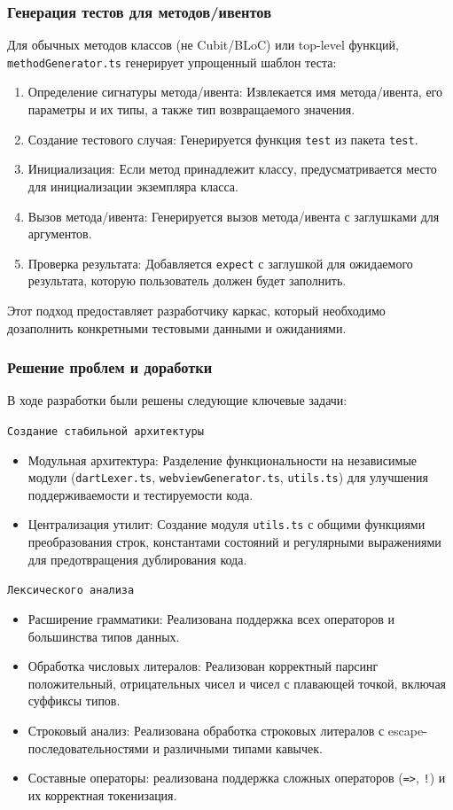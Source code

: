 \documentclass[14pt, russian]{scrartcl}
\begin{document}
\subsubsection{Генерация тестов для методов/ивентов}

Для обычных методов классов (не Cubit/BLoC) или top-level функций, \texttt{methodGenerator.ts} генерирует упрощенный шаблон теста:
\begin{enumerate}
    \item Определение сигнатуры метода/ивента: Извлекается имя метода/ивента, его параметры и их типы, а также тип возвращаемого значения.
    \item Создание тестового случая: Генерируется функция \texttt{test} из пакета \texttt{test}.
    \item Инициализация: Если метод принадлежит классу, предусматривается место для инициализации экземпляра класса.
    \item Вызов метода/ивента: Генерируется вызов метода/ивента с заглушками для аргументов.
    \item Проверка результата: Добавляется \texttt{expect} с заглушкой для ожидаемого результата, которую пользователь должен будет заполнить.
\end{enumerate}
Этот подход предоставляет разработчику каркас, который необходимо дозаполнить конкретными тестовыми данными и ожиданиями.

\subsubsection{Решение проблем и доработки}
В ходе разработки были решены следующие ключевые задачи:

\texttt{Создание стабильной архитектуры}
\begin{itemize}
    \item Модульная архитектура: Разделение функциональности на независимые модули (\texttt{dartLexer.ts}, \texttt{webviewGenerator.ts}, \texttt{utils.ts}) для улучшения поддерживаемости и тестируемости кода.
    \item Централизация утилит: Создание модуля \texttt{utils.ts} с общими функциями преобразования строк, константами состояний и регулярными выражениями для предотвращения дублирования кода.
\end{itemize}

\texttt{Лексического анализа}
\begin{itemize}
    \item Расширение грамматики: Реализована поддержка всех операторов и большинства типов данных.
    \item Обработка числовых литералов: Реализован корректный парсинг положительный, отрицательных чисел и чисел с плавающей точкой, включая суффиксы типов.
    \item Строковый анализ: Реализована обработка строковых литералов с escape-последовательностями и различными типами кавычек.
    \item Составные операторы: реализована поддержка сложных операторов (\texttt{=>}, \texttt{!}) и их корректная токенизация.
\end{itemize}
\end{document}
